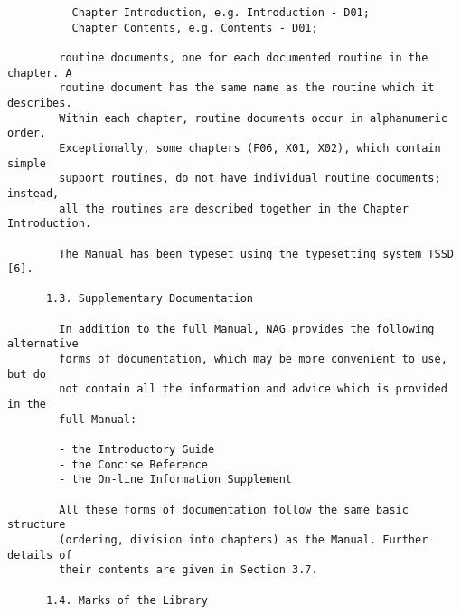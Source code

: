 \begin{small}
\begin{verbatim}
          Chapter Introduction, e.g. Introduction - D01;                          
          Chapter Contents, e.g. Contents - D01;                                  
                                                                                  
        routine documents, one for each documented routine in the chapter. A      
        routine document has the same name as the routine which it describes.     
        Within each chapter, routine documents occur in alphanumeric order.       
        Exceptionally, some chapters (F06, X01, X02), which contain simple        
        support routines, do not have individual routine documents; instead,      
        all the routines are described together in the Chapter Introduction.      
                                                                                  
        The Manual has been typeset using the typesetting system TSSD [6].        
                                                                                  
      1.3. Supplementary Documentation                                            
                                                                                  
        In addition to the full Manual, NAG provides the following alternative    
        forms of documentation, which may be more convenient to use, but do       
        not contain all the information and advice which is provided in the       
        full Manual:                                                              
                                                                                  
        - the Introductory Guide                                                  
        - the Concise Reference                                                   
        - the On-line Information Supplement                                      
                                                                                  
        All these forms of documentation follow the same basic structure          
        (ordering, division into chapters) as the Manual. Further details of      
        their contents are given in Section 3.7.                                  
                                                                                  
      1.4. Marks of the Library                                                   
                                                                                  

\end{verbatim}
\end{small}
